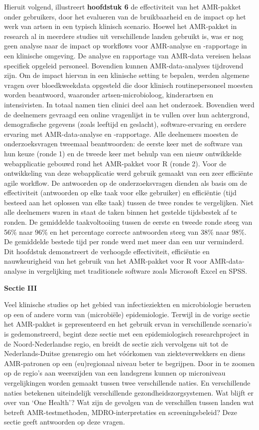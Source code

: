 \documentclass[
]{book}
\begin{document}
Hieruit volgend, illustreert \textbf{hoofdstuk 6} de effectiviteit van het AMR-pakket onder gebruikers, door het evalueren van de bruikbaarheid en de impact op het werk van artsen in een typisch klinisch scenario. Hoewel het AMR-pakket in research al in meerdere studies uit verschillende landen gebruikt is, was er nog geen analyse naar de impact op workflows voor AMR-analyse en -rapportage in een klinische omgeving. De analyse en rapportage van AMR-data vereisen helaas specifiek opgeleid personeel. Bovendien kunnen AMR-data-analyses tijdrovend zijn. Om de impact hiervan in een klinische setting te bepalen, werden algemene vragen over bloedkweekdata opgesteld die door klinisch routinepersoneel moesten worden beantwoord, waaronder artsen-microbioloog, kinderartsen en intensivisten. In totaal namen tien clinici deel aan het onderzoek. Bovendien werd de deelnemers gevraagd een online vragenlijst in te vullen over hun achtergrond, demografische gegevens (zoals leeftijd en geslacht), software-ervaring en eerdere ervaring met AMR-data-analyse en -rapportage. Alle deelnemers moesten de onderzoeksvragen tweemaal beantwoorden: de eerste keer met de software van hun keuze (ronde 1) en de tweede keer met behulp van een nieuw ontwikkelde webapplicatie gebouwd rond het AMR-pakket voor R (ronde 2). Voor de ontwikkeling van deze webapplicatie werd gebruik gemaakt van een zeer efficiënte agile workflow. De antwoorden op de onderzoeksvragen dienden als basis om de effectiviteit (antwoorden op elke taak voor elke gebruiker) en efficiëntie (tijd besteed aan het oplossen van elke taak) tussen de twee rondes te vergelijken. Niet alle deelnemers waren in staat de taken binnen het gestelde tijdsbestek af te ronden. De gemiddelde taakvoltooiing tussen de eerste en tweede ronde steeg van 56\% naar 96\% en het percentage correcte antwoorden steeg van 38\% naar 98\%. De gemiddelde bestede tijd per ronde werd met meer dan een uur verminderd. Dit hoofdstuk demonstreert de verhoogde effectiviteit, efficiëntie en nauwkeurigheid van het gebruik van het AMR-pakket voor R voor AMR-data-analyse in vergelijking met traditionele software zoals Microsoft Excel en SPSS.

\textbf{Sectie III}

Veel klinische studies op het gebied van infectieziekten en microbiologie berusten op een of andere vorm van (microbiële) epidemiologie. Terwijl in de vorige sectie het AMR-pakket is gepresenteerd en het gebruik ervan in verschillende scenario's is gedemonstreerd, begint deze sectie met een epidemiologisch researchproject in de Noord-Nederlandse regio, en breidt de sectie zich vervolgens uit tot de Nederlands-Duitse grensregio om het vóórkomen van ziekteverwekkers en diens AMR-patronen op een (eu)regionaal niveau beter te begrijpen. Door in te zoomen op de regio's aan weerszijden van een landsgrens kunnen op microniveau vergelijkingen worden gemaakt tussen twee verschillende naties. En verschillende naties betekenen uiteindelijk verschillende gezondheidszorgsystemen. Wat blijft er over van `One Health'? Wat zijn de gevolgen van de verschillen tussen landen wat betreft AMR-testmethoden, MDRO-interpretaties en screeningsbeleid? Deze sectie geeft antwoorden op deze vragen.
\end{document}
